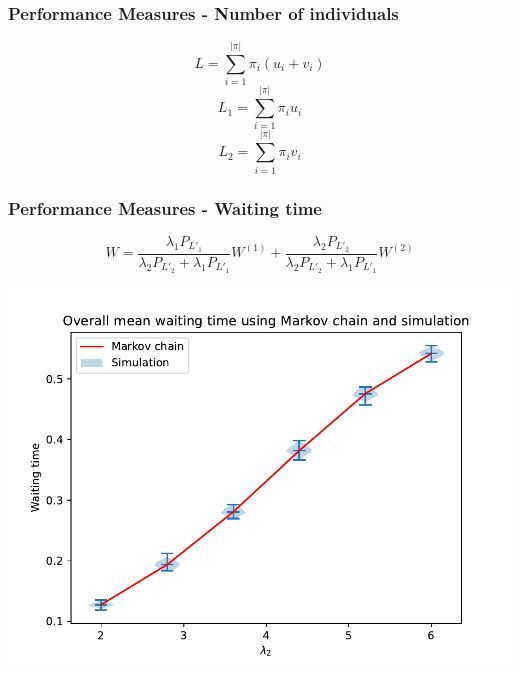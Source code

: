 \begin{frame}
    \frametitle{Performance Measures - Number of individuals}
    \centering

    \pause

    \begin{equation*}
        L = \sum_{i=1}^{|\pi|} \pi_{i} (u_i + v_i) 
    \end{equation*}
    \begin{equation*}
        L_1 = \sum_{i=1}^{|\pi|} \pi_{i} u_i 
    \end{equation*}
    \begin{equation*}
        L_2 = \sum_{i=1}^{|\pi|} \pi_{i} v_i 
    \end{equation*}

\end{frame}


\begin{frame}
    \frametitle{Performance Measures - Waiting time}
    \centering
    \begin{equation}
        W = \frac{\lambda_1 P_{L'_1}}{\lambda_2 P_{L'_2} + \lambda_1 P_{L'_1}} W^{(1)} 
        + \frac{\lambda_2 P_{L'_2}}{\lambda_2 P_{L'_2} + \lambda_1 P_{L'_1}} W^{(2)}
    \end{equation}

    \includegraphics[scale=0.5]{Bin/waiting_overall_comparison.pdf}
\end{frame}


